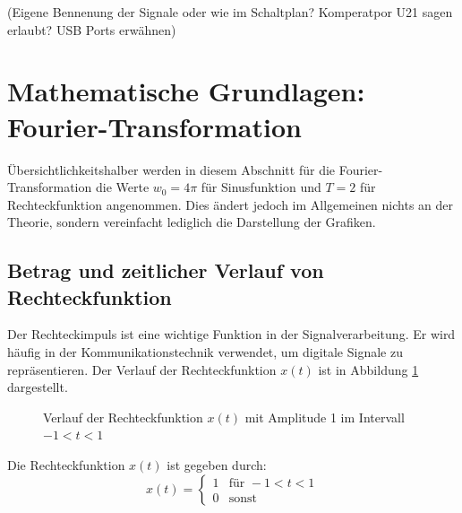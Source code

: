 (Eigene Bennenung der Signale oder wie im Schaltplan? Komperatpor U21 sagen erlaubt? USB Ports erwähnen)


\section{Mathematische Grundlagen: Fourier-Transformation}
Übersichtlichkeitshalber werden in diesem Abschnitt für die Fourier-Transformation die Werte $w_0 = 4\pi$ für Sinusfunktion und $T = 2$ für Rechteckfunktion angenommen. Dies ändert jedoch im Allgemeinen nichts an der Theorie, sondern vereinfacht lediglich die Darstellung der Grafiken.
\subsection{Betrag und zeitlicher Verlauf von Rechteckfunktion}
Der Rechteckimpuls ist eine wichtige Funktion in der Signalverarbeitung.
Er wird häufig in der Kommunikationstechnik verwendet, um digitale Signale zu repräsentieren.
Der Verlauf der Rechteckfunktion $x(t)$ ist in Abbildung \ref{fig:rechteck} dargestellt.
\begin{figure}[H]
    \centering
    \caption{Verlauf der Rechteckfunktion $x(t)$ mit Amplitude 1 im Intervall $-1 < t < 1$}
    \label{fig:rechteck}
\end{figure}

Die Rechteckfunktion $x(t)$ ist gegeben durch:
\[
x(t) = \begin{cases}
    1 & \text{für } -1 < t < 1 \\
    0 & \text{sonst}
    \end{cases}
\]
    
